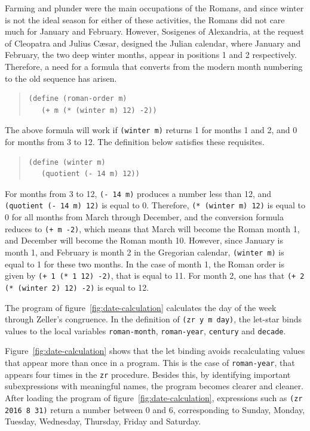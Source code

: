 \documentclass[a4paper,12pt]{book}
\begin{document}
Farming and plunder were the main
occupations of the Romans, and since winter
is not the ideal season for
either of these activities,
the Romans did not care much for
January and February. However,
Sosigenes of Alexandria,
at the request of Cleopatra and
Julius C\ae sar, designed the
Julian calendar, where January
and February, the two deep winter
months, appear in  positions
1 and 2 respectively.
Therefore, a need for a formula
that converts from the modern
month numbering to the
old sequence has arisen.
\begin{quote}
\begin{verbatim}
(define (roman-order m)
   (+ m (* (winter m) 12) -2))
\end{verbatim}
\end{quote}
The above formula will work if \verb|(winter m)|
returns 1 for months 1 and 2, and
0 for months from 3 to 12. The definition
below satisfies these requisites.
\begin{quote}
\begin{verbatim}
(define (winter m)
   (quotient (- 14 m) 12))
\end{verbatim}
\end{quote}
For months from 3 to 12,
\verb|(- 14 m)| produces a number
less than 12, and \verb|(quotient (- 14 m) 12)|
is equal to 0. Therefore,
\verb|(* (winter m) 12)| is equal to
0 for all months from March through December,
and the conversion formula reduces
to \verb|(+ m -2)|, which means that
March will become the Roman month 1, and December
will become the Roman month 10.
However, since January is month 1,
and February is month 2 in the Gregorian
calendar, \verb|(winter m)| is
equal to 1 for these two months.
In the case of month 1,
the Roman order is given by
\verb|(+ 1 (* 1 12) -2)|, that is
equal to 11. For month 2, one has that
\verb|(+ 2 (* (winter 2) 12) -2)|
is equal to 12.

The program of figure~\ref{fig:date-calculation}
calculates the day of the week
through Zeller's congruence. In the definition
of \verb|(zr y m day)|, the let-star 
binds values to the local variables \verb|roman-month|,
\verb|roman-year|, \verb|century| and \verb|decade|.

Figure~\ref{fig:date-calculation} shows that
the let binding avoids recalculating values that
appear more than once in a program. This
is the case of \verb|roman-year|, that
appears four times in the \verb|zr| procedure.
Besides this, by identifying important
subexpressions with meaningful names, the
program becomes clearer and cleaner.
After loading the program of
figure~\ref{fig:date-calculation},
expressions
such as
\verb|(zr 2016 8 31)| return
a number between 0 and 6, corresponding to
Sunday, Monday, Tuesday, Wednesday,
Thursday, Friday and Saturday.
\end{document}

